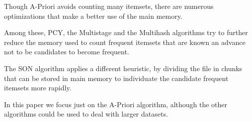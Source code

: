 Though A-Priori avoids counting many itemsets, there are numerous optimizations
that make a better use of the main memory.

Among these, PCY, the Multistage and the Multihash algorithms try to 
further reduce the memory used to count frequent itemsets
that are known an advance not to be candidates to 
become frequent.~\cite{alg:pcy}\cite{alg:multi} 

The SON algorithm applies a different heuristic, by dividing the file in 
chunks that can be stored in main memory to individuate
the candidate frequent itemsets more rapidly.~\cite{alg:son}

In this paper we focus just on the A-Priori algorithm, although the other
algorithms could be used to deal with larger datasets. 